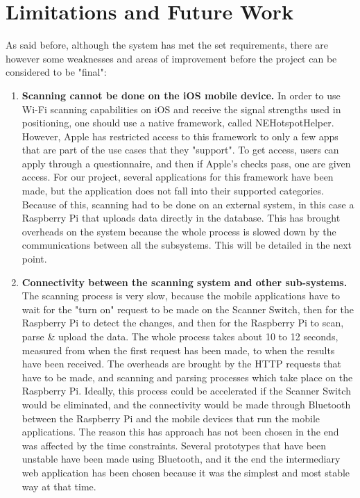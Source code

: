 \section{Limitations and Future Work}
As said before, although the system has met the set requirements, there are however some weaknesses and areas of improvement before the project can be considered to be "final":
\begin{enumerate}

    \item \textbf{Scanning cannot be done on the iOS mobile device.}\newline
    In order to use Wi-Fi scanning capabilities on iOS and receive the signal strengths used in positioning, one should use a native framework, called NEHotspotHelper. However, Apple has restricted access to this framework to only a few apps that are part of the use cases that they "support". To get access, users can apply through a questionnaire, and then if Apple's checks pass, one are given access. For our project, several applications for this framework have been made, but the application does not fall into their supported categories. Because of this, scanning had to be done on an external system, in this case a Raspberry Pi that uploads data directly in the database. This has brought overheads on the system because the whole process is slowed down by the communications between all the subsystems. This will be detailed in the next point.
    
    \item \textbf{Connectivity between the scanning system and other sub-systems.}\newline
    The scanning process is very slow, because the mobile applications have to wait for the "turn on" request to be made on the Scanner Switch, then for the Raspberry Pi to detect the changes, and then for the Raspberry Pi to scan, parse \& upload the data. The whole process takes about 10 to 12 seconds, measured from when the first request has been made, to when the results have been received. The overheads are brought by the HTTP requests that have to be made, and scanning and parsing processes which take place on the Raspberry Pi. Ideally, this process could be accelerated if the Scanner Switch would be eliminated, and the connectivity would be made through Bluetooth between the Raspberry Pi and the mobile devices that run the mobile applications. The reason this has approach has not been chosen in the end was affected by the time constraints. Several prototypes that have been unstable have been made using Bluetooth, and it the end the intermediary web application has been chosen because it was the simplest and most stable way at that time.
    

\end{enumerate}
